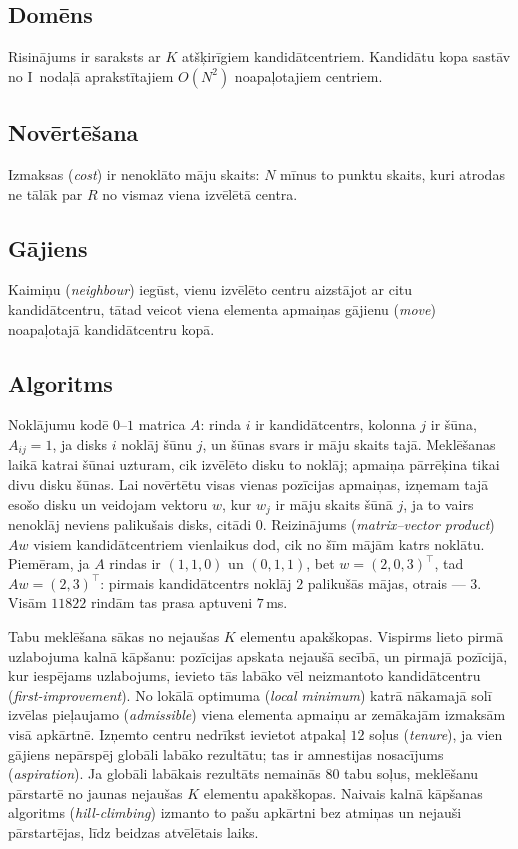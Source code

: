 \documentclass[conference]{IEEEtran}
\begin{document}
\subsection{Domēns}

Risinājums ir saraksts ar $K$ atšķirīgiem kandidātcentriem.
Kandidātu kopa sastāv no I~nodaļā aprakstītajiem $O(N^2)$ noapaļotajiem centriem.

\subsection{Novērtēšana}

Izmaksas (\textit{cost}) ir nenoklāto māju skaits: $N$ mīnus to punktu skaits, kuri atrodas ne tālāk par $R$ no vismaz viena izvēlētā centra.

\subsection{Gājiens}

Kaimiņu (\textit{neighbour}) iegūst, vienu izvēlēto centru aizstājot ar citu kandidātcentru, tātad veicot viena elementa apmaiņas gājienu (\textit{move}) noapaļotajā kandidātcentru kopā.

\subsection{Algoritms}

Noklājumu kodē $0$--$1$ matrica $A$: rinda $i$ ir kandidātcentrs, kolonna $j$ ir šūna, $A_{ij}=1$, ja disks $i$ noklāj šūnu $j$, un šūnas svars ir māju skaits tajā.
Meklēšanas laikā katrai šūnai uzturam, cik izvēlēto disku to noklāj; apmaiņa pārrēķina tikai divu disku šūnas.
Lai novērtētu visas vienas pozīcijas apmaiņas, izņemam tajā esošo disku un veidojam vektoru $w$, kur $w_j$ ir māju skaits šūnā $j$, ja to vairs nenoklāj neviens palikušais disks, citādi $0$.
Reizinājums (\textit{matrix--vector product}) $Aw$ visiem kandidātcentriem vienlaikus dod, cik no šīm mājām katrs noklātu.
Piemēram, ja $A$ rindas ir $(1,1,0)$ un $(0,1,1)$, bet $w=(2,0,3)^\top$, tad $Aw=(2,3)^\top$: pirmais kandidātcentrs noklāj $2$ palikušās mājas, otrais --- $3$.
Visām $11822$ rindām tas prasa aptuveni $7$\,ms.

Tabu meklēšana sākas no nejaušas $K$ elementu apakškopas.
Vispirms lieto pirmā uzlabojuma kalnā kāpšanu: pozīcijas apskata nejaušā secībā, un pirmajā pozīcijā, kur iespējams uzlabojums, ievieto tās labāko vēl neizmantoto kandidātcentru (\textit{first-improvement}).
No lokālā optimuma (\textit{local minimum}) katrā nākamajā solī izvēlas pieļaujamo (\textit{admissible}) viena elementa apmaiņu ar zemākajām izmaksām visā apkārtnē.
Izņemto centru nedrīkst ievietot atpakaļ $12$ soļus (\textit{tenure}), ja vien gājiens nepārspēj globāli labāko rezultātu; tas ir amnestijas nosacījums (\textit{aspiration}).
Ja globāli labākais rezultāts nemainās $80$ tabu soļus, meklēšanu pārstartē no jaunas nejaušas $K$ elementu apakškopas.
Naivais kalnā kāpšanas algoritms (\textit{hill-climbing}) izmanto to pašu apkārtni bez atmiņas un nejauši pārstartējas, līdz beidzas atvēlētais laiks.
\end{document}
